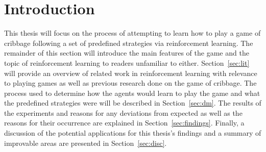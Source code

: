 \section{Introduction}
\label{sec:intro}


This thesis will focus on the process of attempting to learn how to play a game
of cribbage
following a set of predefined strategies
via reinforcement learning.
%
The remainder of this section will introduce the main features
of the game and the topic of reinforcement learning to readers unfamiliar to
either.
%
Section~\ref{sec:lit} will provide an overview of related work in reinforcement
learning with relevance to playing games
as well as previous research done on the game of cribbage.
%
The process used to determine how the agents would learn to play the game
and what the predefined strategies were will be described in
Section~\ref{sec:dm}.
%
The results of the experiments and reasons for any deviations from expected
as well as the reasons for their occurrence
are explained in Section~\ref{sec:findings}.
%
Finally,
a discussion of the potential applications for this thesis's findings and
a summary of improvable areas are presented in Section~\ref{sec:disc}.






